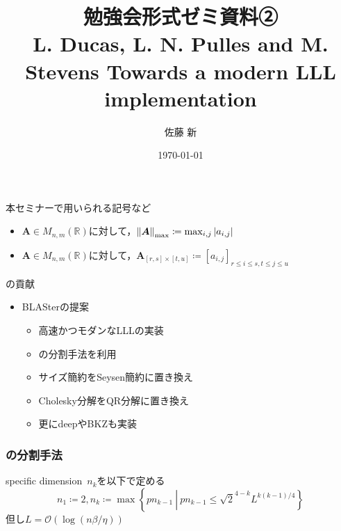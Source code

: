 \documentclass[12pt,aspectratio=169,table,dvipdfmx, leqno]{beamer}
\title[勉強会]{勉強会形式ゼミ資料②\\L. Ducas, L. N. Pulles and M. Stevens Towards a modern LLL implementation\cite{DPS25}}
\author[佐藤]{佐藤 新}
\date{\today}
\begin{document}
\begin{frame}
    \maketitle
\end{frame}

\begin{frame}
    本セミナーで用いられる記号など
    \begin{itemize}
        \item $\bm{A}\in M_{n, m}(\mathbb{R})$に対して，$\norm{\bm{A}}_{\max}\coloneqq \max_{i, j}\abs{a_{i, j}}$
        \item $\bm{A}\in M_{n, m}(\mathbb{R})$に対して，$\bm{A}_{[r, s]\times [t, u]}\coloneqq [a_{i, j}]_{r\le i\le s, t\le j\le u}$
    \end{itemize}
\end{frame}

\begin{frame}{\cite{DPS25}の貢献}
    \begin{itemize}
        \item BLASterの提案
        \begin{itemize}
            \item 高速かつモダンなLLLの実装
            \item \cite{NS16}の分割手法を利用
            \item サイズ簡約をSeysen簡約に置き換え
            \item Cholesky分解をQR分解に置き換え
            \item 更にdeepやBKZも実装
        \end{itemize}
    \end{itemize}
\end{frame}

\begin{frame}
    \frametitle{\cite{NS16}の分割手法}

    \begin{definition}
        specific dimension~$n_k$を以下で定める
        $$n_1\coloneqq 2, n_k\coloneqq \max\left\{pn_{k-1}~\left|~pn_{k-1}\le \sqrt{2}^{4-k} L^{k(k-1)/4}\right.\right\}$$
        但し$L=\mathcal{O}(\log(n\beta/\eta))$
    \end{definition}

\end{frame}
\end{document}
